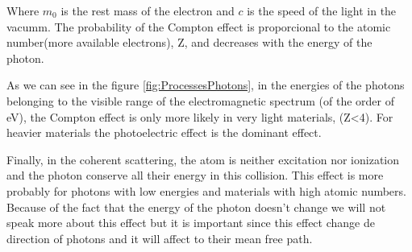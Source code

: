 Where $m_0$ is the rest mass of the electron and $c$ is the speed of the light in the vacumm. The probability of the Compton effect is proporcional to the atomic number(more available electrons), Z,  and decreases with the energy of the photon. 

As we can see in the figure \ref{fig:ProcessesPhotons}, in the energies of the photons belonging to the visible range of the electromagnetic spectrum (of the order of eV), the Compton effect is only more likely in very light materials, (Z<4). For heavier materials the photoelectric effect is the dominant effect.

Finally, in the coherent scattering, the atom is neither excitation nor ionization and the photon conserve all their energy in this collision. This effect is more probably for photons with low energies and materials with high atomic numbers. Because of the fact that the energy of the photon doesn't change we will not speak more about this effect but it is important since this effect change de direction of photons and it will affect to their mean free path.